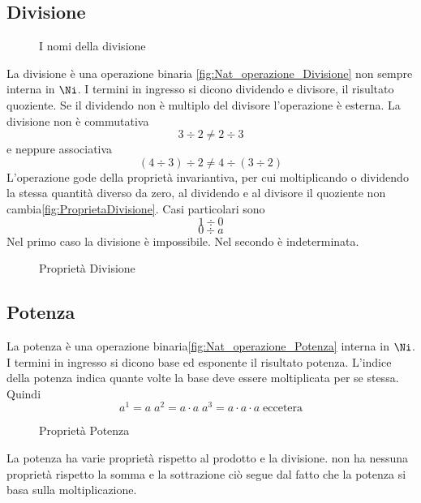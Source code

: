 \subsection{Divisione}
\label{sec:Numerinatdiv}
\begin{figure} %
	\centering

	\caption{I nomi della divisione}
	\label{fig:ProprietaDivisione}
	\end{figure}
La divisione è una operazione binaria \nobs\vref{fig:Nat_operazione_Divisione} non sempre interna in $\Ni$. I termini in ingresso si dicono dividendo e divisore, il risultato quoziente. Se il dividendo non è  multiplo  del divisore l'operazione è esterna. La divisione non è commutativa \[3\div2\neq2\div3\] e neppure associativa \[(4\div3)\div2\neq4\div(3\div2)\] L'operazione gode della proprietà invariantiva, per cui moltiplicando  o dividendo la stessa quantità diverso da zero, al dividendo e al divisore il quoziente non cambia\nobs\vref{fig:ProprietaDivisione}. Casi particolari sono \[1\div0\] \[0\div a\] Nel primo caso la divisione è impossibile. Nel secondo è indeterminata.
\begin{figure} %
	\centering

	\caption{Proprietà Divisione}
		\label{fig:ProprietaDivisione2}
	\end{figure}
\subsection{Potenza}
\label{sec:NumerinatPot}

La potenza è una operazione binaria\nobs\vref{fig:Nat_operazione_Potenza}  interna in $\Ni$. I termini in ingresso si dicono base ed esponente il risultato potenza. L'indice della potenza indica quante volte la base deve essere moltiplicata per se stessa. Quindi\[a^1=a\; a^2=a\cdot a\; a^3=a\cdot a\cdot a\; \text{eccetera} \] 
\begin{figure} %
	\centering
	
	\caption{Proprietà Potenza}
	\label{fig:ProprietaPotenza}\end{figure}
\restoregeometry
La potenza ha varie proprietà rispetto al prodotto e la divisione. non ha nessuna proprietà rispetto la somma e la sottrazione ciò segue dal fatto che la potenza si basa sulla moltiplicazione. 

